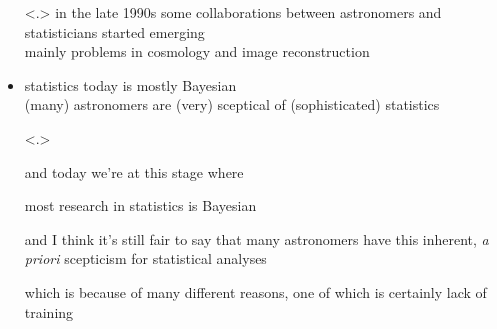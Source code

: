 \documentclass{beamer}              %
\begin{document}
\begin{frame}
\begin{itemize}[<+->]
    \note<.>{
            in the late 1990s some collaborations between astronomers and statisticians started emerging\\

            mainly problems in cosmology and image reconstruction
            }  
    
    \item statistics today is mostly Bayesian\\
          {\footnotesize (many) astronomers are (very) sceptical of (sophisticated) statistics}

    \note<.>{
            and today we're at this stage where

            most research in statistics is Bayesian

            and I think it's still fair to say that many astronomers have this inherent, \emph{a priori} scepticism 
            for statistical analyses

            which is because of many different reasons, one of which is certainly lack of training
            }

  \end{itemize}
  
\end{frame}
\end{document}
